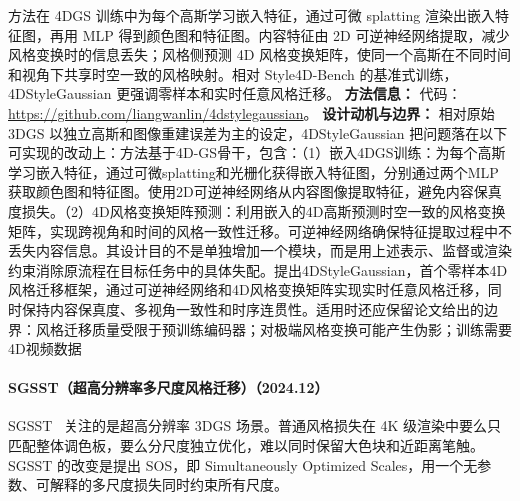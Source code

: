 方法在 4DGS 训练中为每个高斯学习嵌入特征，通过可微 splatting 渲染出嵌入特征图，再用 MLP 得到颜色图和特征图。内容特征由 2D 可逆神经网络提取，减少风格变换时的信息丢失；风格侧预测 4D 风格变换矩阵，使同一个高斯在不同时间和视角下共享时空一致的风格映射。相对 Style4D-Bench 的基准式训练，4DStyleGaussian 更强调零样本和实时任意风格迁移。
\textbf{方法信息：} 代码：\url{https://github.com/liangwanlin/4dstylegaussian}。
\textbf{设计动机与边界：} 相对原始 3DGS 以独立高斯和图像重建误差为主的设定，4DStyleGaussian 把问题落在以下可实现的改动上：方法基于4D-GS骨干，包含：（1）嵌入4DGS训练：为每个高斯学习嵌入特征，通过可微splatting和光栅化获得嵌入特征图，分别通过两个MLP获取颜色图和特征图。使用2D可逆神经网络从内容图像提取特征，避免内容保真度损失。（2）4D风格变换矩阵预测：利用嵌入的4D高斯预测时空一致的风格变换矩阵，实现跨视角和时间的风格一致性迁移。可逆神经网络确保特征提取过程中不丢失内容信息。其设计目的不是单独增加一个模块，而是用上述表示、监督或渲染约束消除原流程在目标任务中的具体失配。提出4DStyleGaussian，首个零样本4D风格迁移框架，通过可逆神经网络和4D风格变换矩阵实现实时任意风格迁移，同时保持内容保真度、多视角一致性和时序连贯性。适用时还应保留论文给出的边界：风格迁移质量受限于预训练编码器；对极端风格变换可能产生伪影；训练需要4D视频数据
\paragraph{SGSST（超高分辨率多尺度风格迁移）（2024.12）}
SGSST~\cite{2412_03371} 关注的是超高分辨率 3DGS 场景。普通风格损失在 4K 级渲染中要么只匹配整体调色板，要么分尺度独立优化，难以同时保留大色块和近距离笔触。SGSST 的改变是提出 SOS，即 Simultaneously Optimized Scales，用一个无参数、可解释的多尺度损失同时约束所有尺度。

